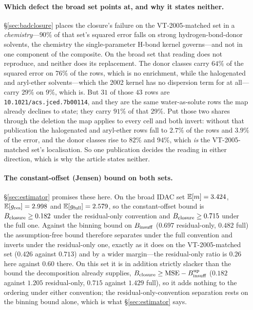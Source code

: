 \paragraph{Which defect the broad set points at, and why it states neither.} \S\ref{sec:badclosure}
places the closure's failure on the VT-2005-matched set in a \emph{chemistry}---$90\%$ of that set's
squared error falls on strong hydrogen-bond-donor solvents, the chemistry the single-parameter
H-bond kernel governs---and not in one component of the composite. On the broad set
that reading does not reproduce, and neither does its replacement. The donor classes carry $64\%$ of
the squared error on $76\%$ of the rows, which is no enrichment, while the halogenated and
aryl-ether solvents---which the 2002 kernel has no dispersion term for at all---carry $29\%$ on
$9\%$, which is. But $31$ of those $43$ rows are \texttt{10.1021/acs.jced.7b00114}, and they are the
same water-as-solute rows the map already declines to state; they carry $91\%$ of that $29\%$. Put
those two shares through the deletion the map applies to every cell and both invert: without that
publication the halogenated and aryl-ether rows fall to $2.7\%$ of the rows and $3.9\%$ of the
error, and the donor classes rise to $82\%$ and $94\%$, which \emph{is} the VT-2005-matched set's
localisation. So one publication decides the reading in either direction, which is why the article
states neither.

\paragraph{The constant-offset (Jensen) bound on both sets.} \S\ref{sec:estimator} promises these here.
On the broad IDAC set $\mathbb{E}[m]=3.424$, $\mathbb{E}[g_{\mathrm{res}}]=2.998$ and $\mathbb{E}[g_{\mathrm{full}}]=2.579$,
so the constant-offset bound is $B_{\mathrm{closure}}\ge0.182$ under the residual-only convention and
$B_{\mathrm{closure}}\ge0.715$ under the full one. Against the binning bound on $B_{\mathrm{insuff}}$ ($0.697$
residual-only, $0.482$ full) the assumption-free bound therefore separates under the full convention
and inverts under the residual-only one, exactly as it does on the VT-2005-matched set ($0.426$ against $0.713$) and by
a wider margin---the residual-only ratio is $0.26$ here against $0.60$ there. On this set it is in
addition strictly slacker than the bound the decomposition already supplies,
$B_{\mathrm{closure}}\ge\mathrm{MSE}-B_{\mathrm{insuff}}^{\mathrm{up}}$ ($0.182$ against $1.205$ residual-only, $0.715$ against
$1.429$ full), so it adds nothing to the ordering under either convention; the residual-only-convention
separation rests on the binning bound alone, which is what \S\ref{sec:estimator} says.

